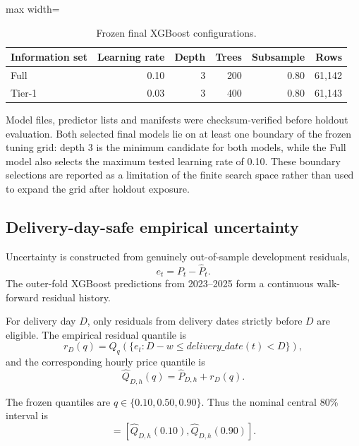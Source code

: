\begin{table}[htbp]
\centering
\caption{Frozen final XGBoost configurations.}
\label{tab:final_hyperparams}
\begin{adjustbox}{max width=\textwidth}
\begin{tabular}{lrrrrr}
\toprule
Information set & Learning rate & Depth & Trees & Subsample & Rows \\
\midrule
Full & 0.10 & 3 & 200 & 0.80 & 61,142 \\
Tier-1 & 0.03 & 3 & 400 & 0.80 & 61,143 \\
\bottomrule
\end{tabular}
\end{adjustbox}
\end{table}

Model files, predictor lists and manifests were checksum-verified before holdout evaluation. Both selected final models lie on at least one boundary of the frozen tuning grid: depth 3 is the minimum candidate for both models, while the Full model also selects the maximum tested learning rate of 0.10. These boundary selections are reported as a limitation of the finite search space rather than used to expand the grid after holdout exposure.

\subsection{Delivery-day-safe empirical uncertainty}

Uncertainty is constructed from genuinely out-of-sample development residuals,
\begin{equation}
e_t=P_t-\widehat P_t.
\end{equation}
The outer-fold XGBoost predictions from 2023--2025 form a continuous walk-forward residual history.

For delivery day \(D\), only residuals from delivery dates strictly before \(D\) are eligible. The empirical residual quantile is
\begin{equation}
r_D(q)=Q_q\left(\{e_t: D-w\leq delivery\_date(t)<D\}\right),
\end{equation}
and the corresponding hourly price quantile is
\begin{equation}
\widehat Q_{D,h}(q)=\widehat P_{D,h}+r_D(q).
\end{equation}

The frozen quantiles are \(q\in\{0.10,0.50,0.90\}\). Thus the nominal central 80\% interval is
\begin{equation}
[L_{D,h},U_{D,h}]
=
[\widehat Q_{D,h}(0.10),\widehat Q_{D,h}(0.90)].
\end{equation}

